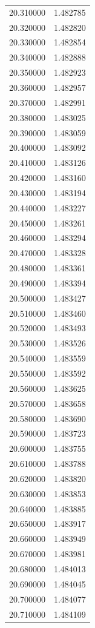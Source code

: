 \begin{tabular}{rr}
20.310000 & 1.482785 \\
20.320000 & 1.482820 \\
20.330000 & 1.482854 \\
20.340000 & 1.482888 \\
20.350000 & 1.482923 \\
20.360000 & 1.482957 \\
20.370000 & 1.482991 \\
20.380000 & 1.483025 \\
20.390000 & 1.483059 \\
20.400000 & 1.483092 \\
20.410000 & 1.483126 \\
20.420000 & 1.483160 \\
20.430000 & 1.483194 \\
20.440000 & 1.483227 \\
20.450000 & 1.483261 \\
20.460000 & 1.483294 \\
20.470000 & 1.483328 \\
20.480000 & 1.483361 \\
20.490000 & 1.483394 \\
20.500000 & 1.483427 \\
20.510000 & 1.483460 \\
20.520000 & 1.483493 \\
20.530000 & 1.483526 \\
20.540000 & 1.483559 \\
20.550000 & 1.483592 \\
20.560000 & 1.483625 \\
20.570000 & 1.483658 \\
20.580000 & 1.483690 \\
20.590000 & 1.483723 \\
20.600000 & 1.483755 \\
20.610000 & 1.483788 \\
20.620000 & 1.483820 \\
20.630000 & 1.483853 \\
20.640000 & 1.483885 \\
20.650000 & 1.483917 \\
20.660000 & 1.483949 \\
20.670000 & 1.483981 \\
20.680000 & 1.484013 \\
20.690000 & 1.484045 \\
20.700000 & 1.484077 \\
20.710000 & 1.484109 \\

\end{tabular}
